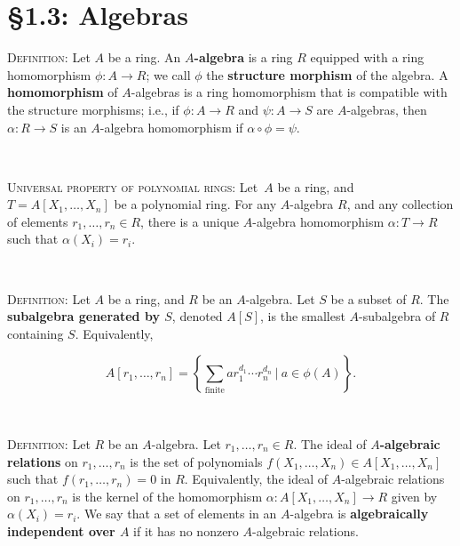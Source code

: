 \documentclass[12pt]{amsart}
\newcommand{\showsol}[1]{\def\displaysol{#1}}
\begin{document}
\showsol{1}
	
	\thispagestyle{empty}
	
	\section*{\S1.3: Algebras}	

\begin{framed}

\noindent \textsc{Definition:} Let $A$ be a ring. An \textbf{$A$-algebra} is a ring $R$ equipped with a ring homomorphism ${\phi:A\to R}$; we call $\phi$ the \textbf{structure morphism} of the algebra\footnotemark. A \textbf{homomorphism} of $A$-algebras is a ring homomorphism that is compatible with the structure morphisms; i.e., if $\phi:A\to R$ and $\psi:A\to S$ are $A$-algebras, then $\alpha:R\to S$ is an $A$-algebra homomorphism if $\alpha\circ \phi = \psi$.


\

\noindent \textsc{Universal property of polynomial rings:} Let\footnotemark \ $A$ be a ring, and $T=A[X_1,\dots,X_n]$ be a polynomial ring. For any $A$-algebra $R$, and any collection of elements $r_1,\dots,r_n\in R$, there is a unique $A$-algebra homomorphism $\alpha: T\to R$ such that $\alpha(X_i) = r_i$.


\


\noindent \textsc{Definition:} Let $A$ be a ring, and $R$ be an $A$-algebra. Let $S$ be a subset of $R$. The \textbf{subalgebra generated by $S$}, denoted $A[S]$, is the smallest $A$-subalgebra of $R$ containing $S$. Equivalently\footnotemark,

\[ A[r_1,\dots,r_n] = \left\{ \sum_{\mathrm{finite}} a r_1^{d_1} \cdots r_n^{d_n} \ | \ a\in \phi(A) \right\}.\]

\


\noindent \textsc{Definition:} Let $R$ be an $A$-algebra. Let $r_1,\dots,r_n\in R$. The ideal of \textbf{$A$-algebraic relations} on $r_1,\dots,r_n$ is the set of polynomials $f(X_1,\dots,X_n)\in A[X_1,\dots,X_n]$ such that ${f(r_1,\dots,r_n)=0}$ in $R$. Equivalently, the ideal of $A$-algebraic relations on $r_1,\dots,r_n$ is the kernel of the homomorphism ${\alpha: A[X_1,\dots,X_n]\to R}$ given by $\alpha(X_i)=r_i$. We say that a set of elements in an $A$-algebra is \textbf{algebraically independent over $A$} if it has  no nonzero $A$-algebraic relations.


\end{framed}
\end{document}
